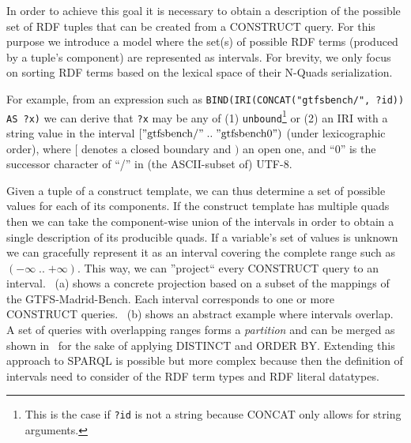 In order to achieve this goal it is necessary to obtain a description of the possible set of RDF tuples that can be created from a CONSTRUCT query.
For this purpose we introduce a  model where the set(s) of possible RDF terms (produced by a tuple's component) are represented as intervals.
For brevity, we only focus on sorting RDF terms based on the lexical space of their N-Quads serialization.

For example, from an expression such as \lstinline{BIND(IRI(CONCAT("gtfsbench/", ?id)) AS ?x)} we can derive that \texttt{?x} may be any of (1) \texttt{unbound}\footnote{This is the case if \texttt{?id} is not a string because CONCAT only allows for string arguments.} or (2) an IRI with a string value in the interval $[\mathrm{"gtfsbench/"}\; .. \; \mathrm{"gtfsbench0")}$ (under lexicographic order), where $[$ denotes a closed boundary and $)$ an open one, and ``0'' is the successor character of ``/'' in (the ASCII-subset of) UTF-8.

Given a tuple of a construct template, we can thus determine a set of possible values for each of its components.
If the construct template has multiple quads then we can take the component-wise union of the intervals in order to obtain a single description of its producible quads.
If a variable's set of values is unknown we can gracefully represent it as an interval covering the complete range such as $({-\infty}\; .. \; {+\infty})$.
This way, we can ''project`` every CONSTRUCT query to an interval. ~(a) shows a concrete projection based on a subset of the mappings of the GTFS-Madrid-Bench. Each interval corresponds to one or more CONSTRUCT queries.
~(b) shows an abstract example where intervals overlap.
A set of queries with overlapping ranges forms a \emph{partition} and can be merged as shown in~ for the sake of applying DISTINCT and ORDER BY.
Extending this approach to SPARQL is possible but more complex because then the definition of intervals need to consider of the RDF term types and RDF literal datatypes.


